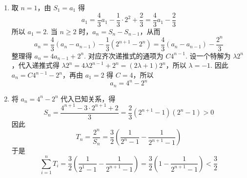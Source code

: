 \begin{solution}
\begin{enumerate}
\item 取 \(n=1\)，由 \(S_1=a_1\) 得
\[
a_1=\frac43a_1-\frac13\cdot2^2+\frac23=\frac43a_1-\frac23
\]
所以 \(a_1=2\). 当 \(n\geq2\) 时，\(a_n=S_n-S_{n-1}\)，从而
\[
a_n=\frac43(a_n-a_{n-1})-\frac13\left(2^{n+1}-2^n\right)=\frac43(a_n-a_{n-1})-\frac{2^n}{3}
\]
整理得 \(a_n=4a_{n-1}+2^n\). 对应齐次递推式的通项为 \(C4^{n-1}\). 设一个特解为 \(\lambda2^n\)，代入递推式得 \(\lambda2^n=4\lambda2^{n-1}+2^n=(2\lambda+1)2^n\)，所以 \(\lambda=-1\). 因此 \(a_n=C4^{n-1}-2^n\)，再由 \(a_1=2\) 得 \(C=4\)，所以
\[
a_n=4^n-2^n
\]
\item 将 \(a_n=4^n-2^n\) 代入已知关系，得
\[
S_n=\frac{4^{n+1}-3\cdot2^{n+1}+2}{3}=\frac23(2^{n+1}-1)(2^n-1)>0
\]
因此
\[
T_n=\frac{2^n}{S_n}=\frac32\left(\frac1{2^n-1}-\frac1{2^{n+1}-1}\right)
\]
于是
\[
\sum_{i=1}^nT_i=\frac32\left(\frac1{2^1-1}-\frac1{2^{n+1}-1}\right)=\frac32\left(1-\frac1{2^{n+1}-1}\right)<\frac32
\]
\end{enumerate}
\end{solution}
